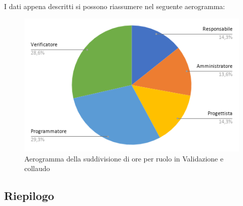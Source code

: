         I dati appena descritti si possono riassumere nel seguente aerogramma:
        \begin{figure}[!h]
            \vspace{5px}
            \includegraphics[scale=0.5]{../../../Images/Diagrammi/Diagramma a torta/ore validificazione.png}
            \centering
            \caption{Aerogramma della suddivisione di ore per ruolo in Validazione e collaudo}
        \end{figure}  


\subsection{Riepilogo}
